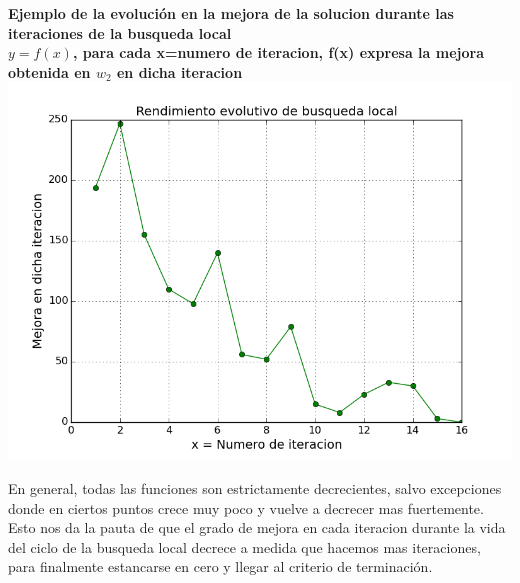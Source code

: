 \begin{center}
	\textbf{Ejemplo de la evoluci\'on en la mejora de la solucion durante las iteraciones de la busqueda local}\\
	\textbf{$y = f(x)$, para cada x=numero de iteracion, f(x) expresa la mejora obtenida en $w_2$ en dicha iteracion}\\
	\includegraphics[scale=0.7]{experimentos/bqlocal/rendimiento_evolucion_iteraciones_cliques/test-results/bqlocal/instancia_120_7130_in_iters.png}
\end{center}

En general, todas las funciones son estrictamente decrecientes, salvo excepciones donde en ciertos puntos crece muy poco y vuelve a decrecer mas fuertemente. Esto nos da la pauta de que el grado de mejora en cada iteracion durante la vida del ciclo de la busqueda local decrece a medida que hacemos mas iteraciones, para finalmente estancarse en cero y llegar al criterio de terminaci\'on.

